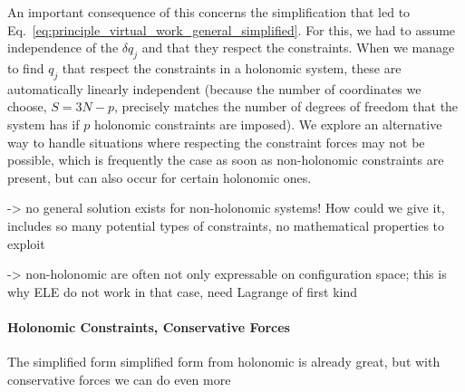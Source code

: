 \documentclass[../class_mech_main.tex]{subfiles}
\begin{document}
An important consequence of this concerns the simplification that led to Eq.~\eqref{eq:principle_virtual_work_general_simplified}. For this, we had to assume independence of the $\delta q_j$ and that they respect the constraints. When we manage to find $q_j$ that respect the constraints in a holonomic system, these are automatically linearly independent (because the number of coordinates we choose, $S = 3N - p$, precisely matches the number of degrees of freedom that the system has if $p$ holonomic constraints are imposed). We explore an alternative way to handle situations where respecting the constraint forces may not be possible, which is frequently the case as soon as non-holonomic constraints are present, but can also occur for certain holonomic ones.









-> no general solution exists for non-holonomic systems! How could we give it, includes so many potential types of constraints, no mathematical properties to exploit


-> non-holonomic are often not only expressable on configuration space; this is why ELE do not work in that case, need Lagrange of first kind



			\paragraph{Holonomic Constraints, Conservative Forces}
The simplified form simplified form from holonomic is already great, but with conservative forces we can do even more
\end{document}
